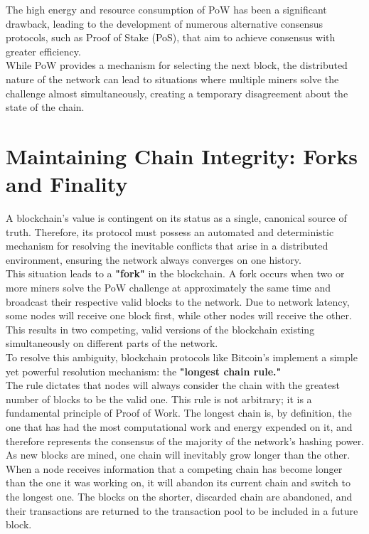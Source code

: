 \documentclass{scrbook}
\begin{document}
The high energy and resource consumption of PoW has been a significant drawback, leading to the development of numerous alternative consensus protocols, such as Proof of Stake (PoS), that aim to achieve consensus with greater efficiency. \\

While PoW provides a mechanism for selecting the next block, the distributed nature of the network can lead to situations where multiple miners solve the challenge almost simultaneously, creating a temporary disagreement about the state of the chain.

\chapter{Maintaining Chain Integrity: Forks and Finality}

A blockchain's value is contingent on its status as a single, canonical source of truth. Therefore, its protocol must possess an automated and deterministic mechanism for resolving the inevitable conflicts that arise in a distributed environment, ensuring the network always converges on one history. \\

This situation leads to a \textbf{"fork"} in the blockchain. A fork occurs when two or more miners solve the PoW challenge at approximately the same time and broadcast their respective valid blocks to the network. Due to network latency, some nodes will receive one block first, while other nodes will receive the other. This results in two competing, valid versions of the blockchain existing simultaneously on different parts of the network. \\


To resolve this ambiguity, blockchain protocols like Bitcoin's implement a simple yet powerful resolution mechanism: the \textbf{"longest chain rule."} \\

The rule dictates that nodes will always consider the chain with the greatest number of blocks to be the valid one. This rule is not arbitrary; it is a fundamental principle of Proof of Work. The longest chain is, by definition, the one that has had the most computational work and energy expended on it, and therefore represents the consensus of the majority of the network's hashing power. As new blocks are mined, one chain will inevitably grow longer than the other. When a node receives information that a competing chain has become longer than the one it was working on, it will abandon its current chain and switch to the longest one. The blocks on the shorter, discarded chain are abandoned, and their transactions are returned to the transaction pool to be included in a future block. \\
\end{document}
